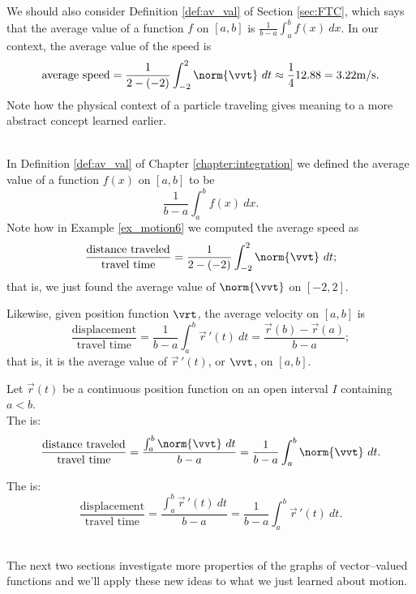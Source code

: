 {\begin{enumerate}
	{%
	}%
	We should also consider Definition \ref{def:av_val} of Section \ref{sec:FTC}, which says that the average value of a function $f$ on $[a,b]$ is $\frac{1}{b-a}\int_a^b f(x)\ dx$. In our context, the average value of the speed is
	$$\text{average speed} = \frac{1}{2-(-2)}\int_{-2}^2 \norm{\vvt}\ dt \approx \frac14 12.88 = 3.22\text{m/s}.$$
	Note how the physical context of a particle traveling gives meaning to a more abstract concept learned earlier.
\end{enumerate}
\baselineskip
}\\

In Definition \ref{def:av_val} of Chapter \ref{chapter:integration} we defined the average value of a function $f(x)$ on $[a,b]$ to be $$ \frac{1}{b-a}\int_a^bf(x)\ dx.$$
Note how in Example \ref{ex_motion6} we computed the average speed as
$$\frac{\text{distance traveled}}{\text{travel time}} = \frac1{2-(-2)}\int_{-2}^2\norm{\vvt}\ dt;$$
that is, we just found the average value of $\norm{\vvt}$ on $[-2,2]$.

Likewise, given position function $\vrt$, the average velocity on $[a,b]$ is
$$\frac{\text{displacement}}{\text{travel time}} = \frac1{b-a}\int_a^b \vec{r}\,'(t)\ dt = \frac{\vec r(b)-\vec r(a)}{b-a};$$
that is, it is the average value of $\vec r\,'(t)$, or $\vvt$, on $[a,b]$.\\

{Let $\vec r(t)$ be a continuous position function on an open interval $I$ containing $a<b$. \\

The  is:
$$\frac{\text{distance traveled}}{\text{travel time}} = \frac{\int_a^b \norm{\vvt}\ dt}{b-a} = \frac1{b-a}\int_a^b\norm{\vvt}\ dt.$$

The  is:
$$\frac{\text{displacement}}{\text{travel time}} = \frac{\int_a^b \vec{r}\,'(t)\ dt}{b-a} = \frac1{b-a}\int_a^b\vec{r}\,'(t)\ dt.$$


}\\

The next two sections investigate more properties of the graphs of vector--valued functions and we'll apply these new ideas to what we just learned about motion.



